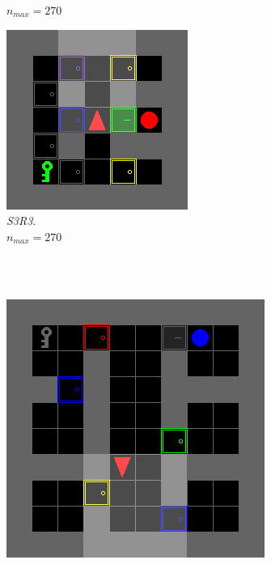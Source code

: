 \documentclass{article}
\begin{document}
\begin{figure}[H]
\begin{subfigure}[b]{0.32\linewidth}
{    \(n_{max}=270\)}
  \end{subfigure}
  \hfill
  \begin{subfigure}[b]{0.32\linewidth}
    \centering
    \includegraphics[width=\linewidth]{Tasks/KeyCorridor/S3R3}
    \caption{\textit{S3R3}. \\
    \(n_{max}=270\)}
  \end{subfigure}
  \\ \\
  \begin{subfigure}[b]{0.32\linewidth}
    \centering
    \includegraphics[width=\linewidth]{Tasks/KeyCorridor/S4R3}

\end{subfigure}
\end{figure}
\end{document}
